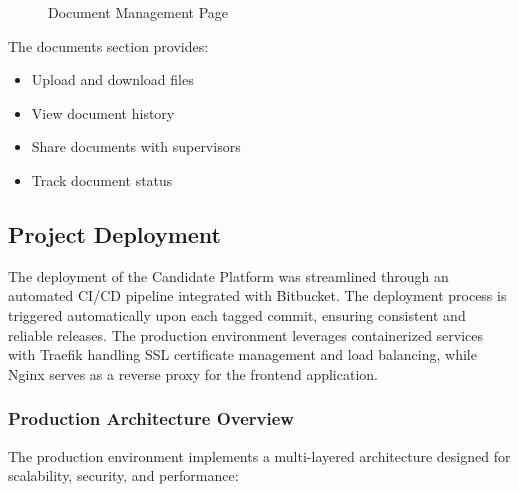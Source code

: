 \begin{figure}[H]
    \centering
    \caption{Document Management Page}
    \label{fig:documents}
\end{figure}

The documents section provides:
\begin{itemize}
    \item Upload and download files
    \item View document history
    \item Share documents with supervisors
    \item Track document status
\end{itemize}

\subsection{Project Deployment}
\noindent
The deployment of the Candidate Platform was streamlined through an automated CI/CD pipeline integrated with Bitbucket. The deployment process is triggered automatically upon each tagged commit, ensuring consistent and reliable releases. The production environment leverages containerized services with Traefik handling SSL certificate management and load balancing, while Nginx serves as a reverse proxy for the frontend application.

\subsubsection{Production Architecture Overview}
The production environment implements a multi-layered architecture designed for scalability, security, and performance:

